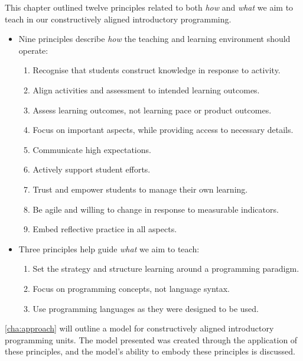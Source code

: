 This chapter outlined twelve principles related to both \emph{how} and \emph{what} we aim to teach in our constructively aligned introductory programming.
\begin{itemize}[noitemsep,nolistsep]
	\item Nine principles describe \emph{how} the teaching and learning environment should operate:
	\begin{enumerate}
		\item \label{itm:construct} Recognise that students construct knowledge in response to activity.
		\item \label{itm:align} Align activities and assessment to intended learning outcomes.
		\item \label{itm:formative} Assess learning outcomes, not learning pace or product outcomes.
		\item \label{itm:focus} Focus on important aspects, while providing access to necessary details.
		\item \label{itm:expectations} Communicate high expectations.
		\item \label{itm:support} Actively support student efforts.
		\item \label{itm:theory_y} Trust and empower students to manage their own learning.
		\item \label{itm:agile} Be agile and willing to change in response to measurable indicators.
		\item \label{itm:reflect} Embed reflective practice in all aspects.
	\end{enumerate}
	\item Three principles help guide \emph{what} we aim to teach:
	\begin{enumerate}[start=10,noitemsep,nolistsep]
		\item \label{itm:paradigm} Set the strategy and structure learning around a programming paradigm.
		\item \label{itm:concepts} Focus on programming concepts, not language syntax.
		\item \label{itm:authentic} Use programming languages as they were designed to be used.
	\end{enumerate}
\end{itemize}

\cref{cha:approach} will outline a model for constructively aligned introductory programming units. The model presented was created through the application of these principles, and the model's ability to embody these principles is discussed.


